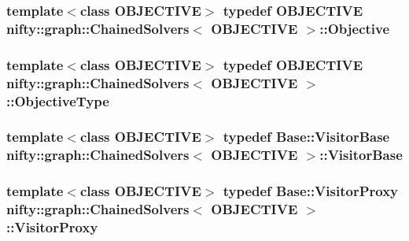\subsubsection[{Objective}]{\setlength{\rightskip}{0pt plus 5cm}template$<$class O\+B\+J\+E\+C\+T\+I\+V\+E$>$ typedef O\+B\+J\+E\+C\+T\+I\+V\+E {\bf nifty\+::graph\+::\+Chained\+Solvers}$<$ O\+B\+J\+E\+C\+T\+I\+V\+E $>$\+::{\bf Objective}}\label{classnifty_1_1graph_1_1ChainedSolvers_a963bd16d8459fe660e207c4a57facf5e}
\hypertarget{classnifty_1_1graph_1_1ChainedSolvers_af640cd977746e90c49366fe7a30e80b1}{}
\subsubsection[{Objective\+Type}]{\setlength{\rightskip}{0pt plus 5cm}template$<$class O\+B\+J\+E\+C\+T\+I\+V\+E$>$ typedef O\+B\+J\+E\+C\+T\+I\+V\+E {\bf nifty\+::graph\+::\+Chained\+Solvers}$<$ O\+B\+J\+E\+C\+T\+I\+V\+E $>$\+::{\bf Objective\+Type}}\label{classnifty_1_1graph_1_1ChainedSolvers_af640cd977746e90c49366fe7a30e80b1}
\hypertarget{classnifty_1_1graph_1_1ChainedSolvers_a1f90d20ae903cad5e6434d4019b28463}{}
\subsubsection[{Visitor\+Base}]{\setlength{\rightskip}{0pt plus 5cm}template$<$class O\+B\+J\+E\+C\+T\+I\+V\+E$>$ typedef {\bf Base\+::\+Visitor\+Base} {\bf nifty\+::graph\+::\+Chained\+Solvers}$<$ O\+B\+J\+E\+C\+T\+I\+V\+E $>$\+::{\bf Visitor\+Base}}\label{classnifty_1_1graph_1_1ChainedSolvers_a1f90d20ae903cad5e6434d4019b28463}
\hypertarget{classnifty_1_1graph_1_1ChainedSolvers_a2a0d35b426487bc1c84acbac754688e9}{}
\subsubsection[{Visitor\+Proxy}]{\setlength{\rightskip}{0pt plus 5cm}template$<$class O\+B\+J\+E\+C\+T\+I\+V\+E$>$ typedef {\bf Base\+::\+Visitor\+Proxy} {\bf nifty\+::graph\+::\+Chained\+Solvers}$<$ O\+B\+J\+E\+C\+T\+I\+V\+E $>$\+::{\bf Visitor\+Proxy}}\label{classnifty_1_1graph_1_1ChainedSolvers_a2a0d35b426487bc1c84acbac754688e9}
\hypertarget{classnifty_1_1graph_1_1ChainedSolvers_a34ed66af894d4382882ec3b81260686f}{}
